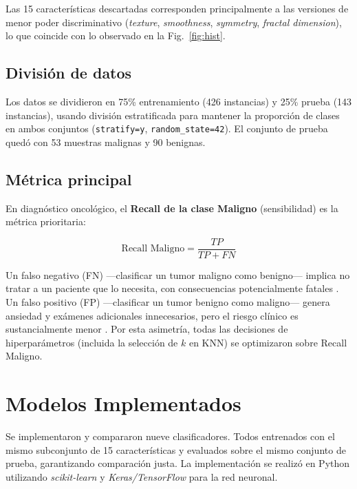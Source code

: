 \documentclass[journal]{IEEEtran}
\begin{document}
Las 15 características descartadas corresponden principalmente a las versiones de menor poder discriminativo (\textit{texture}, \textit{smoothness}, \textit{symmetry}, \textit{fractal dimension}), lo que coincide con lo observado en la Fig.~\ref{fig:hist}.

\subsection{División de datos}

Los datos se dividieron en 75\% entrenamiento (426 instancias) y 25\% prueba (143 instancias), usando división estratificada para mantener la proporción de clases en ambos conjuntos (\texttt{stratify=y}, \texttt{random\_state=42}). El conjunto de prueba quedó con 53 muestras malignas y 90 benignas.

\subsection{Métrica principal}

En diagnóstico oncológico, el \textbf{Recall de la clase Maligno} (sensibilidad) es la métrica prioritaria:

\begin{equation}
  \text{Recall Maligno} = \frac{TP}{TP + FN}
\end{equation}

Un falso negativo (FN) —clasificar un tumor maligno como benigno— implica no tratar a un paciente que lo necesita, con consecuencias potencialmente fatales \cite{hossin2015}. Un falso positivo (FP) —clasificar un tumor benigno como maligno— genera ansiedad y exámenes adicionales innecesarios, pero el riesgo clínico es sustancialmente menor \cite{elmore2015}. Por esta asimetría, todas las decisiones de hiperparámetros (incluida la selección de $k$ en KNN) se optimizaron sobre Recall Maligno.

\section{Modelos Implementados}

Se implementaron y compararon nueve clasificadores. Todos entrenados con el mismo subconjunto de 15 características y evaluados sobre el mismo conjunto de prueba, garantizando comparación justa. La implementación se realizó en Python utilizando \textit{scikit-learn} \cite{pedregosa2011} y \textit{Keras/TensorFlow} \cite{chollet2015} para la red neuronal.
\end{document}
